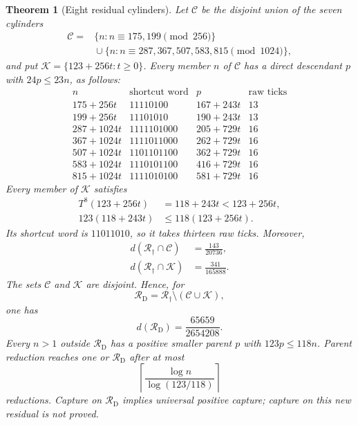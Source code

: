 \documentclass[11pt,letterpaper]{article}
\newtheorem{theorem}{Theorem}
\begin{document}
\begin{theorem}[Eight residual cylinders]\label{thm:EightResidualCylinders}
Let \(\mathcal C\) be the disjoint union of the seven cylinders
\[
\begin{aligned}
\mathcal C={}&\{n:n\equiv175,199\pmod{256}\}\\
&{}\cup\{n:n\equiv287,367,507,583,815\pmod{1024}\},
\end{aligned}
\]
and put \(\mathcal K=\{123+256t:t\ge0\}\). Every member \(n\) of
\(\mathcal C\) has a direct descendant \(p\) with \(24p\le23n\), as follows:
\[
\begin{array}{c|c|c|c}
n&\text{shortcut word}&p&\text{raw ticks}\\ \hline
175+256t&11110100&167+243t&13\\
199+256t&11101010&190+243t&13\\
287+1024t&1111101000&205+729t&16\\
367+1024t&1111011000&262+729t&16\\
507+1024t&1101101100&362+729t&16\\
583+1024t&1110101100&416+729t&16\\
815+1024t&1111010100&581+729t&16
\end{array}
\]
Every member of \(\mathcal K\) satisfies
\[
\begin{aligned}
T^8(123+256t)&=118+243t<123+256t,\\
123(118+243t)&\le118(123+256t).
\end{aligned}
\]
Its shortcut word is \(11011010\), so it takes thirteen raw ticks. Moreover,
\[
\begin{aligned}
d(\mathcal R_{\dagger}\cap\mathcal C)&=\frac{143}{20736},\\
d(\mathcal R_{\dagger}\cap\mathcal K)&=\frac{341}{165888}.
\end{aligned}
\]
The sets \(\mathcal C\) and \(\mathcal K\) are disjoint. Hence, for
\[
\mathcal R_{\mathrm D}
 =\mathcal R_{\dagger}\setminus(\mathcal C\cup\mathcal K),
\]
one has
\[
d(\mathcal R_{\mathrm D})=\frac{65659}{2654208}.
\]
Every \(n>1\) outside \(\mathcal R_{\mathrm D}\) has a positive smaller
parent \(p\) with \(123p\le118n\). Parent reduction reaches one or
\(\mathcal R_{\mathrm D}\) after at most
\[
\left\lceil\frac{\log n}{\log(123/118)}\right\rceil
\]
reductions. Capture on \(\mathcal R_{\mathrm D}\) implies universal positive
capture; capture on this new residual is not proved.
\end{theorem}
\end{document}
